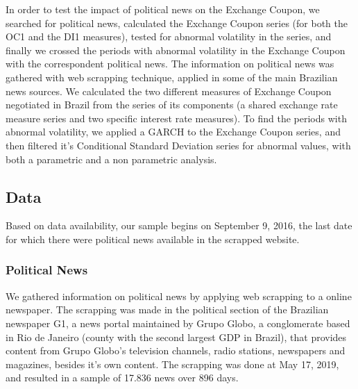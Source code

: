 \documentclass[a4paper]{article}
\begin{document}
In order to test the impact of political news on the Exchange Coupon, we searched for political news, calculated the Exchange Coupon series (for both the OC1 and the DI1 measures), tested for abnormal volatility in the series, and finally we crossed the periods with abnormal volatility in the Exchange Coupon with the correspondent political news. The information on political news was gathered with web scrapping technique, applied in some of the main Brazilian news sources. We calculated the two different measures of Exchange Coupon negotiated in Brazil from the series of its components (a shared exchange rate measure series and two specific interest rate measures). To find the periods with abnormal volatility, we applied a GARCH to the Exchange Coupon series, and then filtered it's Conditional Standard Deviation series for abnormal values, with both a parametric and a non parametric analysis.


\subsection{Data}


Based on data availability, our sample begins on September 9, 2016, the last date for which there were political news available in the scrapped website.


\subsubsection{Political News}


We gathered information on political news by applying web scrapping to a online newspaper. The scrapping was made in the political section of the Brazilian newspaper G1, a news portal maintained by Grupo Globo, a conglomerate based in Rio de Janeiro (county with the second largest GDP in Brazil), that provides content from Grupo Globo's television channels, radio stations, newspapers and magazines, besides it's own content. The scrapping was done at May 17, 2019, and resulted in a sample of 17.836 news over 896 days.

\end{document}
